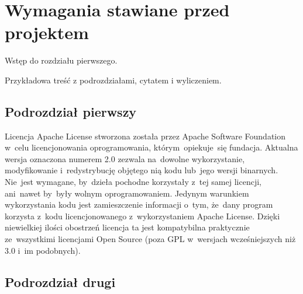 \chapter{Wymagania stawiane przed projektem}

Wstęp do rozdziału pierwszego. 

Przykładowa treść z podrozdziałami, cytatem i wyliczeniem.

\section{Podrozdział pierwszy}

Licencja Apache License stworzona została przez Apache Software
Foundation w~celu licencjonowania oprogramowania, którym~opiekuje~się fundacja.
Aktualna wersja oznaczona numerem 2.0 zezwala na~dowolne wykorzystanie,
modyfikowanie i~redystrybucję objętego nią kodu lub~jego wersji binarnych. 
Nie~jest wymagane, by~dzieła pochodne korzystały z~tej samej licencji, ani~nawet
by~były wolnym oprogramowaniem. Jedynym warunkiem wykorzystania kodu jest
zamieszczenie informacji o~tym, że~dany program korzysta z~kodu licencjonowanego
z~wykorzystaniem Apache License. Dzięki niewielkiej ilości obostrzeń licencja ta
jest kompatybilna praktycznie ze~wszystkimi licencjami Open Source (poza GPL
w~wersjach wcześniejszych niż 3.0 i~im podobnych)\cite{Apache}.

\section{Podrozdział drugi}

